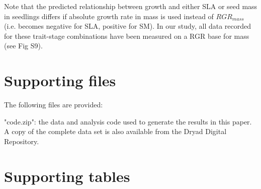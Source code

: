\documentclass[a4paper]{article}\usepackage[]{graphicx}\usepackage[]{color}
\begin{document}
Note that the predicted relationship between growth and either SLA or seed mass in seedlings differs if absolute growth rate in mass is used instead of $RGR_{mass}$ (i.e. becomes negative for SLA, positive for SM). In our study, all data recorded for these trait-stage combinations have been measured on a RGR base for mass (see Fig S9).




\clearpage
\begin{appendices}\label{sec:appendices}
\renewcommand{\thefigure}{S\arabic{figure}}
\renewcommand{\thetable}{S\arabic{table}}

\setcounter{figure}{0}
\setcounter{table}{0}

\section{Supporting files}\label{app:supp_info_files}

The following files are provided:

"code.zip": the data and analysis code used to generate the results in this paper. A copy of the complete data set is also available from the Dryad Digital Repository.


\clearpage
\section{Supporting tables}\label{app:supp_info_tables}

\linespread{1}


\end{appendices}
\end{document}
